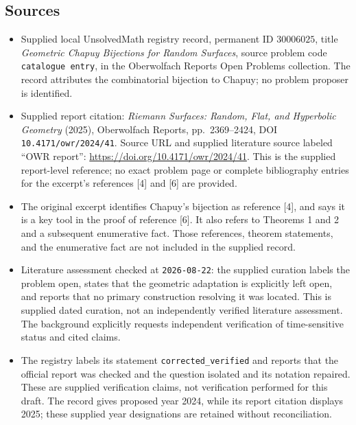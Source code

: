 \documentclass[11pt]{article}
\begin{document}
\subsection{Sources}
\begin{itemize}
\item Supplied local UnsolvedMath registry record, permanent ID \(30006025\), title \emph{Geometric Chapuy Bijections for Random Surfaces}, source problem code \texttt{catalogue entry}, in the Oberwolfach Reports Open Problems collection. The record attributes the combinatorial bijection to Chapuy; no problem proposer is identified.
\item Supplied report citation: \emph{Riemann Surfaces: Random, Flat, and Hyperbolic Geometry} (2025), Oberwolfach Reports, pp.\ 2369--2424, DOI \texttt{10.4171/owr/2024/41}. Source URL and supplied literature source labeled ``OWR report'': \url{https://doi.org/10.4171/owr/2024/41}. This is the supplied report-level reference; no exact problem page or complete bibliography entries for the excerpt's references [4] and [6] are provided.
\item The original excerpt identifies Chapuy's bijection as reference [4], and says it is a key tool in the proof of reference [6]. It also refers to Theorems 1 and 2 and a subsequent enumerative fact. Those references, theorem statements, and the enumerative fact are not included in the supplied record.
\item Literature assessment checked at \texttt{2026-08-22}: the supplied curation labels the problem open, states that the geometric adaptation is explicitly left open, and reports that no primary construction resolving it was located. This is supplied dated curation, not an independently verified literature assessment. The background explicitly requests independent verification of time-sensitive status and cited claims.
\item The registry labels its statement \texttt{corrected\_verified} and reports that the official report was checked and the question isolated and its notation repaired. These are supplied verification claims, not verification performed for this draft. The record gives proposed year 2024, while its report citation displays 2025; these supplied year designations are retained without reconciliation.
\end{itemize}
\end{document}
